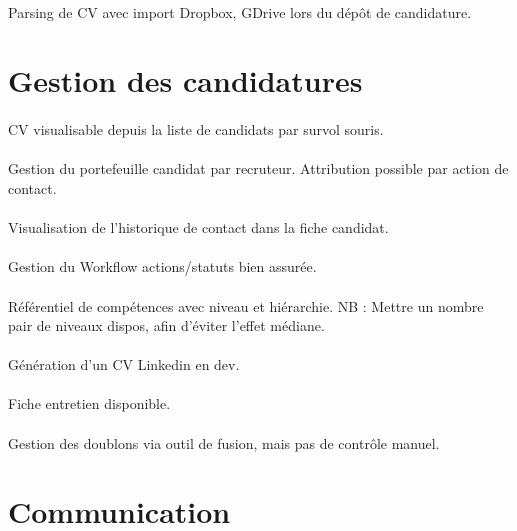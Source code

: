 \paragraph{} Parsing de CV avec import Dropbox, GDrive lors du dépôt de candidature.

\section{Gestion des candidatures}
\paragraph{} CV visualisable depuis la liste de candidats par survol souris.
\paragraph{} Gestion du portefeuille candidat par recruteur. Attribution possible par action de contact.
\paragraph{} Visualisation de l'historique de contact dans la fiche candidat.
\paragraph{} Gestion du Workflow actions/statuts bien assurée.
\paragraph{} Référentiel de compétences avec niveau et hiérarchie. NB : Mettre un nombre pair de niveaux dispos, afin d'éviter l'effet médiane.
\paragraph{} Génération d'un CV Linkedin en dev.
\paragraph{} Fiche entretien disponible.
\paragraph{} Gestion des doublons via outil de fusion, mais pas de contrôle manuel.


\section{Communication}
